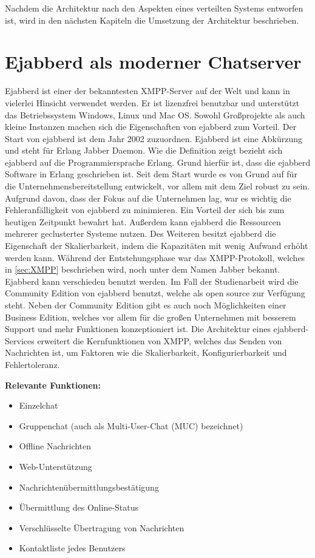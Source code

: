 \documentclass[a4paper,titlepage,halfparskip,12pt]{scrreprt}
\begin{document}
\begin{onehalfspacing}
Nachdem die Architektur nach den Aspekten eines verteilten Systems entworfen ist, wird in den nächsten Kapiteln die Umsetzung der Architektur beschrieben.

\pagebreak

\section{Ejabberd als moderner Chatserver}
\label{sec:ejabberd}

Ejabberd ist einer der bekanntesten \ac{XMPP}-Server auf der Welt und kann in vielerlei Hinsicht verwendet werden. Er ist lizenzfrei benutzbar und unterstützt das Betriebssystem Windows, Linux und Mac OS. Sowohl Großprojekte als auch kleine Instanzen machen sich die Eigenschaften von ejabberd zum Vorteil. Der Start von ejabberd ist dem Jahr 2002 zuzuordnen. Ejabberd ist eine Abkürzung und steht für \glqq Erlang Jabber Daemon\grqq. Wie die Definition zeigt bezieht sich ejabberd auf die Programmiersprache Erlang. Grund hierfür ist, dass die ejabberd Software in Erlang geschrieben ist. Seit dem Start wurde es von Grund auf für die Unternehmensbereitstellung entwickelt, vor allem mit dem Ziel robust zu sein. Aufgrund davon, dass der Fokus auf die Unternehmen lag, war es wichtig die Fehleranfälligkeit von ejabberd zu minimieren. Ein Vorteil der sich bis zum heutigen Zeitpunkt bewahrt hat. Außerdem kann ejabberd die Ressourcen mehrerer geclusterter Systeme nutzen. Des Weiteren besitzt ejabberd die Eigenschaft der Skalierbarkeit, indem die Kapazitäten mit wenig Aufwand erhöht werden kann. Während der Entstehungsphase war das \ac{XMPP}-Protokoll, welches in \autoref{sec:XMPP} beschrieben wird, noch unter dem Namen Jabber bekannt. Ejabberd kann verschieden benutzt werden. Im Fall der Studienarbeit wird die Community Edition von ejabberd benutzt, welche als open source zur Verfügung steht. Neben der Community Edition gibt es auch noch Möglichkeiten einer Business Edition, welches vor allem für die großen Unternehmen mit besserem Support und mehr Funktionen konzeptioniert ist. Die Architektur eines ejabberd-Services erweitert die Kernfunktionen von \ac{XMPP}, welches das Senden von Nachrichten ist, um Faktoren wie die Skalierbarkeit, Konfigurierbarkeit und Fehlertoleranz.

\bigskip

\textbf{Relevante Funktionen:}

\begin{itemize}
	\item Einzelchat
	\item Gruppenchat (auch als Multi-User-Chat (\ac{MUC}) bezeichnet)
	\item Offline Nachrichten 
	\item Web-Unterstützung
	\item Nachrichtenübermittlungsbestätigung
	\item Übermittlung des Online-Status
	\item Verschlüsselte Übertragung von Nachrichten
	\item Kontaktliste jedes Benutzers
\end{itemize}


\end{onehalfspacing}
\end{document}
